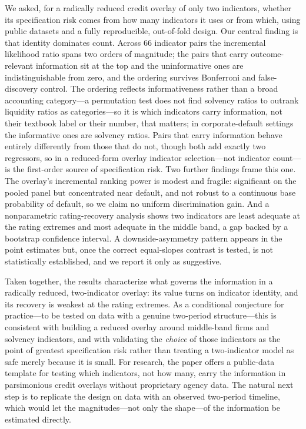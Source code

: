 \documentclass[pdflatex,sn-mathphys-ay]{sn-jnl}
\begin{document}
We asked, for a radically reduced credit overlay of only two indicators, whether its specification
risk comes from how many indicators it uses or from which, using public datasets and a fully
reproducible, out-of-fold design. Our central finding is that identity dominates count. Across 66
indicator pairs the incremental likelihood ratio spans two orders of magnitude; the pairs that carry
outcome-relevant information sit at the top and the uninformative ones are indistinguishable from zero,
and the ordering survives Bonferroni and false-discovery control. The ordering reflects informativeness
rather than a broad accounting category---a permutation test does not find solvency ratios to outrank
liquidity ratios as categories---so it is which indicators carry information, not their textbook label
or their number, that matters; in corporate-default settings the informative ones are solvency ratios.
Pairs that carry information behave entirely differently from those that do not, though both add exactly
two regressors, so in a reduced-form overlay indicator selection---not indicator count---is the
first-order source of specification risk. Two further findings frame this one. The overlay's incremental ranking power is
modest and fragile: significant on the pooled panel but concentrated near default, and not robust to a
continuous base probability of default, so we claim no uniform discrimination gain. And a nonparametric
rating-recovery analysis shows two indicators are least adequate at the rating extremes and most
adequate in the middle band, a gap backed by a bootstrap confidence interval. A downside-asymmetry
pattern appears in the point estimates but, once the correct equal-slopes contrast is tested, is not
statistically established, and we report it only as suggestive.

Taken together, the results characterize what governs the information in a radically reduced,
two-indicator overlay: its value turns on indicator identity, and its recovery is weakest at the rating
extremes. As a conditional conjecture for practice---to be tested on data with a genuine two-period
structure---this is consistent with building a reduced overlay around middle-band firms and solvency
indicators, and with validating the \emph{choice} of those indicators as the point of greatest
specification risk rather than treating a two-indicator model as safe merely because it is small. For
research, the paper offers a public-data template for testing which indicators, not how many, carry the
information in parsimonious credit overlays without proprietary agency data. The natural next step is to replicate the design on data with an observed two-period timeline,
which would let the magnitudes---not only the shape---of the information be estimated directly.
\end{document}
